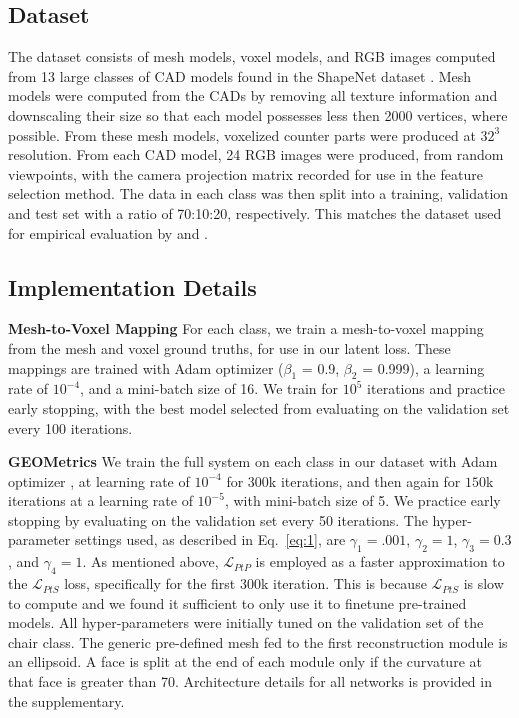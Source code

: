\documentclass{article}
\begin{document}
\subsection{Dataset}

The dataset consists of mesh models, voxel models, and RGB images computed from 13 large classes of CAD models found in the ShapeNet dataset \cite{ShapeNet}. Mesh models were computed from the CADs by removing all texture information and downscaling their size so that each model possesses less then 2000 vertices, where possible. From these mesh models, voxelized counter parts were produced at $32^3$ resolution. From each CAD model, 24 RGB images were produced, from random viewpoints, with the camera projection matrix recorded for use in the feature selection method. The data in each class was then split into a training, validation and test set with a ratio of 70:10:20, respectively. This matches the dataset used for empirical evaluation by \citet{Pixel2Mesh} and \citet{mineNIPS}. 


\subsection{Implementation Details} 
\textbf{Mesh-to-Voxel Mapping} \enskip For each class, we train a mesh-to-voxel mapping from the mesh and voxel ground truths, for use in our latent loss. These mappings are trained with Adam optimizer \cite{kingma2014adam} ($\beta_1$ = 0.9, $\beta_2$ = 0.999), a learning rate of $10^{-4}$, and a mini-batch size of 16. We train for $10^5$ iterations and practice early stopping, with the best model selected from evaluating on the validation set every 100 iterations. 

\textbf{GEOMetrics} \enskip We train the full system on each class in our dataset with Adam optimizer \cite{kingma2014adam}, at learning rate of $10^{-4}$ for $300$k iterations, and then again for $150$k iterations at a learning rate of $10^{-5}$, with mini-batch size of 5. We practice early stopping by evaluating on the validation set every 50 iterations. The hyper-parameter settings used, as described in Eq.~\eqref{eq:1}, are $\gamma_1 = .001$, $\gamma_2 = 1$,  $\gamma_3 = 0.3$, and $\gamma_4 = 1$. As mentioned above,  
$\mathcal{L}_{PtP}$ is employed as a faster approximation to the $\mathcal{L}_{PtS}$ loss, specifically for the first 300k iteration. This is because $\mathcal{L}_{PtS}$ is slow to compute and we found it sufficient to only use it to finetune pre-trained models. All hyper-parameters were initially tuned on the validation set of the chair class.  The generic pre-defined mesh fed to the first reconstruction module is an ellipsoid. A face is split at the end of each module only if the curvature at that face is greater than 70\textdegree. Architecture details for all networks is provided in the supplementary. 
\end{document}
